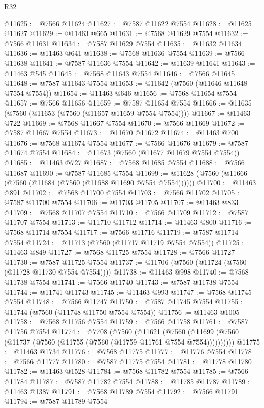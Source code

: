 \begin{lexlean}{R32}
\begin{coremodule}
@11625 := @7566 @11624
@11627 := @7587 @11622 @7554
@11628 := @11625 @11627
@11629 := @11463 @665
@11631 := @7568 @11629 @7554
@11632 := @7566 @11631
@11634 := @7587 @11629 @7554
@11635 := @11632 @11634
@11636 := @11463 @641
@11638 := @7568 @11636 @7554
@11639 := @7566 @11638
@11641 := @7587 @11636 @7554
@11642 := @11639 @11641
@11643 := @11463 @545
@11645 := @7568 @11643 @7554
@11646 := @7566 @11645
@11648 := @7587 @11643 @7554
@11653 := @11642 (@7560 (@11646 @11648 @7554 @7554))
@11654 := @11463 @646
@11656 := @7568 @11654 @7554
@11657 := @7566 @11656
@11659 := @7587 @11654 @7554
@11666 := @11635 (@7560 (@11653 (@7560 (@11657 @11659 @7554 @7554))))
@11667 := @11463 @722
@11669 := @7568 @11667 @7554
@11670 := @7566 @11669
@11672 := @7587 @11667 @7554
@11673 := @11670 @11672
@11674 := @11463 @700
@11676 := @7568 @11674 @7554
@11677 := @7566 @11676
@11679 := @7587 @11674 @7554
@11684 := @11673 (@7560 (@11677 @11679 @7554 @7554))
@11685 := @11463 @727
@11687 := @7568 @11685 @7554
@11688 := @7566 @11687
@11690 := @7587 @11685 @7554
@11699 := @11628 (@7560 (@11666 (@7560 (@11684 (@7560 (@11688 @11690 @7554 @7554))))))
@11700 := @11463 @891
@11702 := @7568 @11700 @7554
@11703 := @7566 @11702
@11705 := @7587 @11700 @7554
@11706 := @11703 @11705
@11707 := @11463 @833
@11709 := @7568 @11707 @7554
@11710 := @7566 @11709
@11712 := @7587 @11707 @7554
@11713 := @11710 @11712
@11714 := @11463 @800
@11716 := @7568 @11714 @7554
@11717 := @7566 @11716
@11719 := @7587 @11714 @7554
@11724 := @11713 (@7560 (@11717 @11719 @7554 @7554))
@11725 := @11463 @849
@11727 := @7568 @11725 @7554
@11728 := @7566 @11727
@11730 := @7587 @11725 @7554
@11737 := @11706 (@7560 (@11724 (@7560 (@11728 @11730 @7554 @7554))))
@11738 := @11463 @998
@11740 := @7568 @11738 @7554
@11741 := @7566 @11740
@11743 := @7587 @11738 @7554
@11744 := @11741 @11743
@11745 := @11463 @993
@11747 := @7568 @11745 @7554
@11748 := @7566 @11747
@11750 := @7587 @11745 @7554
@11755 := @11744 (@7560 (@11748 @11750 @7554 @7554))
@11756 := @11463 @1005
@11758 := @7568 @11756 @7554
@11759 := @7566 @11758
@11761 := @7587 @11756 @7554
@11774 := @7708
    (@7560
      (@11621
        (@7560 (@11699 (@7560 (@11737 (@7560 (@11755 (@7560 (@11759 @11761 @7554 @7554))))))))))
@11775 := @11463 @1734
@11776 := @7568 @11775
@11777 := @11776 @7554
@11778 := @7566 @11777
@11780 := @7587 @11775 @7554
@11781 := @11778 @11780
@11782 := @11463 @1528
@11784 := @7568 @11782 @7554
@11785 := @7566 @11784
@11787 := @7587 @11782 @7554
@11788 := @11785 @11787
@11789 := @11463 @1387
@11791 := @7568 @11789 @7554
@11792 := @7566 @11791
@11794 := @7587 @11789 @7554

\end{coremodule}
\end{lexlean}
